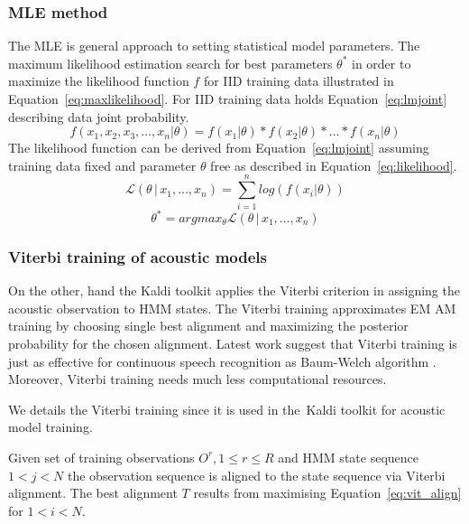 {\subsubsection*{\acl{MLE} method}
\label{sub:mle_method}
The \ac{MLE} is general approach to setting statistical model parameters.
The maximum likelihood estimation search for best parameters $\theta^*$ 
in order to maximize the likelihood function $f$ for \ac{IID} training data illustrated in Equation~\ref{eq:maxlikelihood}.
For \ac{IID} training data holds Equation~\ref{eq:lmjoint} describing data joint probability. 
\begin{equation}\label{eq:lmjoint}
    f(x_1, x_2, x_3, \ldots, x_n | \theta) = f(x_1 | \theta) * f(x_2 | \theta) * \ldots * f(x_n | \theta)
\end{equation}
The likelihood function can be derived from Equation~\ref{eq:lmjoint} assuming training data fixed
and parameter $\theta$ free as described in Equation~\ref{eq:likelihood}.
\begin{equation}\label{eq:likelihood}
    \mathcal{L}(\theta\,|\,x_1,\ldots,x_n) = \sum_{i=1}^n log(f(x_i|\theta))
\end{equation}
\begin{equation}\label{eq:maxlikelihood}
    \theta^* = argmax_{\theta} \mathcal{L}(\theta\,|\,x_1,\ldots,x_n)
\end{equation}

\subsubsection*{Viterbi training of acoustic models}
On the other, hand the Kaldi toolkit applies the Viterbi criterion in assigning the acoustic observation to \ac{HMM} states.
The Viterbi training approximates \ac{EM} \ac{AM} training by choosing single best alignment and maximizing the posterior probability for the chosen alignment.
Latest work suggest that Viterbi training is just as effective for continuous speech recognition as Baum-Welch algorithm \cite{rodriguez2003comparative}.
Moreover, Viterbi training needs much less computational resources. 

We details the Viterbi training since it is used in the~Kaldi toolkit for acoustic model training.

Given set of training observations $O^r, 1 \le r \le R$ and \ac{HMM} state sequence $ 1 < j < N$ the observation sequence is aligned to the state sequence via Viterbi alignment.\cite{buthpitiya2012parallel}
The best alignment $T$ results from maximising Equation~\ref{eq:vit_align} for $ 1 < i < N$.

}
